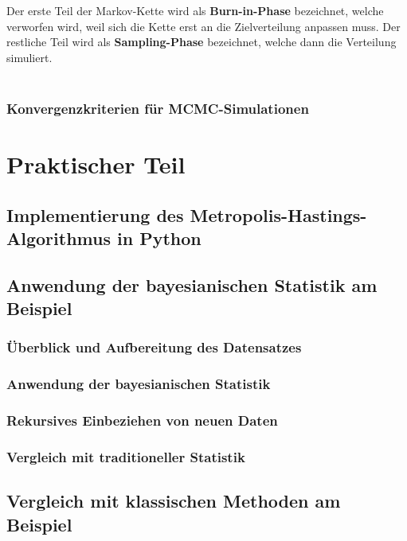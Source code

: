 \documentclass[a4paper,12pt]{article}
\begin{document}
Der erste Teil der Markov-Kette wird als \textbf{Burn-in-Phase} bezeichnet, welche verworfen wird, weil sich die Kette erst an die Zielverteilung anpassen muss. Der restliche Teil wird als \textbf{Sampling-Phase} bezeichnet, welche dann die Verteilung simuliert. \parencite[226f.]{HandbookMonteCarloMethods} \\\\

\subsubsection{Konvergenzkriterien für MCMC-Simulationen}
\newpage

\section{Praktischer Teil}

\subsection{Implementierung des Metropolis-Hastings-Algorithmus in Python}
\newpage

\subsection{Anwendung der bayesianischen Statistik am Beispiel}
\newpage

\subsubsection{Überblick und Aufbereitung des Datensatzes}
\newpage

\subsubsection{Anwendung der bayesianischen Statistik}
\newpage

\subsubsection{Rekursives Einbeziehen von neuen Daten}
\newpage

\subsubsection{Vergleich mit traditioneller Statistik}

\subsection{Vergleich mit klassischen Methoden am Beispiel}
\end{document}
